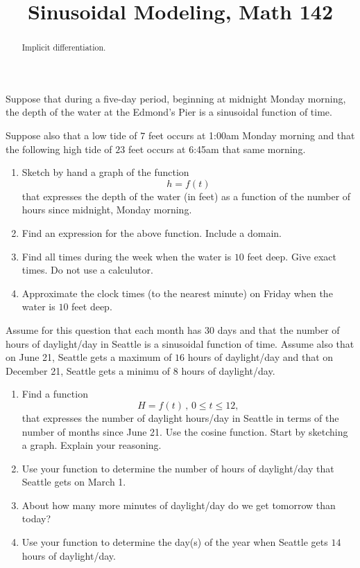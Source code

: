 \documentclass{ximera}
\title{Sinusoidal Modeling, Math 142}
\begin{document}
\begin{abstract}
Implicit differentiation.
\end{abstract}
\maketitle



\begin{question} \label{Qhhjklfghjfd}
Suppose that during a five-day period, beginning at midnight Monday morning, the depth of the water at the Edmond's Pier is a sinusoidal function of time.

Suppose also that a low tide of $7$ feet occurs at 1:00am Monday morning and that the following high tide of $23$ feet occurs at 6:45am that same morning.  

\begin{enumerate}
\item Sketch by hand a graph of the function
\[
   h = f(t)
\] 
that expresses the depth of the water (in feet) as a function of the number of hours since midnight, Monday morning.

\item Find an expression for the above function. Include a domain.

\item Find all times during the week when the water is $10$ feet deep. Give exact times. Do not use a calculutor.

\item Approximate the clock times (to the nearest minute) on Friday when the water is $10$ feet deep.

\end{enumerate}
\end{question}


\begin{question} \label{Q04365d9ggdgbgh}
Assume for this question that each month has 30 days and that the number of hours of daylight/day in Seattle is a sinusoidal function of time. Assume also that on June 21, Seattle gets a maximum of $16$ hours of daylight/day and that on December 21, Seattle gets a minimu of $8$ hours of daylight/day.

\begin{enumerate}
\item Find a function 
\[
   H = f(t) \, , \, 0\leq t\leq 12,
\]
that expresses the number of daylight hours/day in Seattle in terms of the number of months since June 21. Use the cosine function. Start by sketching a graph. Explain your reasoning.

\item Use your function to determine the number of hours of daylight/day that Seattle gets on March 1.

\item About how many more minutes of daylight/day do we get tomorrow than today? 

\item Use your function to determine the day(s) of the year when Seattle gets $14$ hours of daylight/day.

\end{enumerate}

\end{question}
\end{document}

